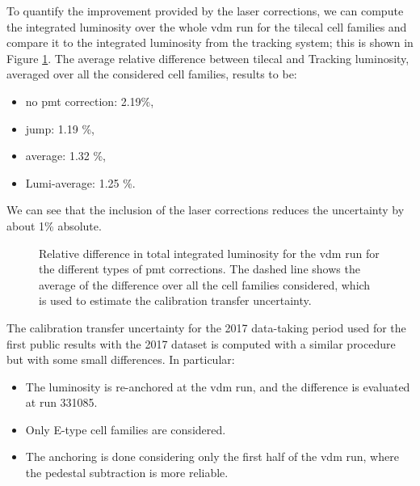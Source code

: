 To quantify the improvement provided by the laser corrections, we can compute the integrated luminosity over the whole 
\gls{vdm} run for the \gls{tilecal} cell families and compare it to the integrated luminosity from the tracking system; 
this is shown in Figure \ref{fig:apppmt:totallumi}. 
The average relative difference between \gls{tilecal} and Tracking luminosity, averaged over all 
the considered cell families, results to be:
\begin{itemize}
\item no \gls{pmt} correction: 2.19\%,
\item jump: 1.19 \%,
\item average: 1.32 \%,
\item Lumi-average: 1.25 \%.
\end{itemize}
\noindent We can see that the inclusion of the laser corrections reduces the uncertainty by about 1\% absolute.

\begin{figure}[htbp]
\centering
{}
\caption{Relative difference in total integrated luminosity for the \gls{vdm} run for the different types of 
\gls{pmt} corrections. The dashed line shows the average of the difference over all the cell families considered, which 
is used to estimate the calibration transfer uncertainty.}
\label{fig:apppmt:totallumi}
\end{figure}

The calibration transfer uncertainty for the 2017 data-taking period used for the first public results 
with the 2017 dataset 
is computed with a similar procedure but with some small differences.
In particular:
\begin{itemize}
\item The luminosity is re-anchored at the \gls{vdm} run, and the difference is evaluated at run 331085. 
\item Only E-type cell families are considered.
\item The anchoring is done considering only the first half of the \gls{vdm} run, where the 
pedestal subtraction is more reliable.
\end{itemize}

